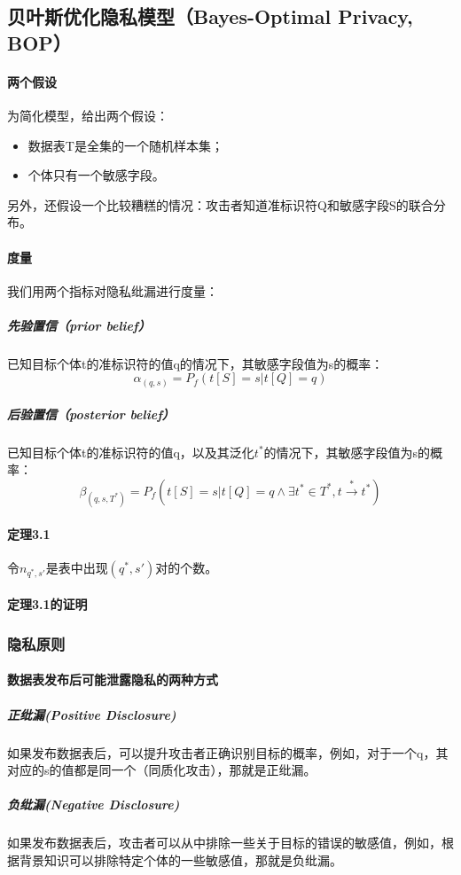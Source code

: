 \documentclass[12pt,a4paper]{article}
\begin{document}
\subsection{贝叶斯优化隐私模型（Bayes-Optimal Privacy, BOP）}
\paragraph{两个假设} 为简化模型，给出两个假设：
\begin{itemize}
	\item 数据表T是全集的一个随机样本集；
	\item 个体只有一个敏感字段。
\end{itemize}
另外，还假设一个比较糟糕的情况：攻击者知道准标识符Q和敏感字段S的联合分布。
\paragraph{度量} 我们用两个指标对隐私纰漏进行度量：
	\subparagraph{先验置信（prior belief）} 已知目标个体t的准标识符的值q的情况下，其敏感字段值为s的概率：
	\begin{equation}
		\alpha_{(q,s)} = P_f(t[S]=s|t[Q]=q)
	\end{equation}

	\subparagraph{后验置信（posterior belief）} 已知目标个体t的准标识符的值q，以及其泛化$t^*$的情况下，其敏感字段值为s的概率：
	\begin{equation}
		\beta_{(q,s,T^*)}=P_f(t[S]=s|t[Q]=q \wedge \exists t^* \in T^*, t \overset{*}{\rightarrow}t^* )
	\end{equation}
\paragraph{定理3.1} 令$n_{q^*,s'}$是表中出现$(q^*, s')$对的个数。

\paragraph{定理3.1的证明}

\subsubsection{隐私原则}
\paragraph{数据表发布后可能泄露隐私的两种方式}
	\subparagraph{正纰漏(Positive Disclosure)} 如果发布数据表后，可以提升攻击者正确识别目标的概率，例如，对于一个q，其对应的s的值都是同一个（同质化攻击），那就是正纰漏。 
	\subparagraph{负纰漏(Negative Disclosure)} 如果发布数据表后，攻击者可以从中排除一些关于目标的错误的敏感值，例如，根据背景知识可以排除特定个体的一些敏感值，那就是负纰漏。
\end{document}
